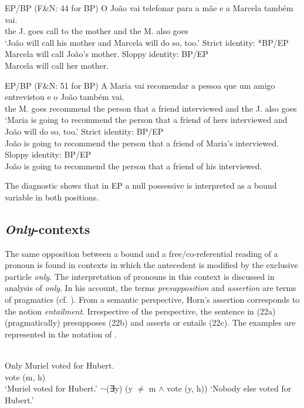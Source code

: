 \documentclass[output=paper]{langsci/langscibook}
\begin{document}
\ea%
         EP\slash BP (F\&N: 44 for BP)\label{ex:wein:20}
    \ea
    \gll O João vai telefonar para a mãe e a Marcela também vai.\\
         the J. goes call to the mother and the M. also goes  \\
    \glt ‘João will call his mother and Marcela will do so, too.’
    \ex Strict identity: *BP\slash *EP\\Marcela will call João’s mother.
    \ex Sloppy identity: BP\slash EP\\Marcela will call her mother.
    \z
\z

\ea%
         EP\slash BP (F\&N: 51 for BP)\label{ex:wein:21}
    \ea
    \gll A Maria vai recomendar a pessoa que um amigo entrevistou e o João também vai.\\
         the M. goes recommend the person that a friend interviewed and the J. also goes\\
    \glt ‘Maria is going to recommend the person that a friend of hers interviewed and João will do so, too.’
    \ex Strict identity: BP\slash *EP\\João is going to recommend the person that a friend of Maria’s interviewed.\\
    \ex Sloppy identity: BP\slash EP\\João is going to recommend the person that a friend of his interviewed. 
    \z
\z

The diagnostic shows that in EP a null possessive is interpreted as a bound variable in both positions.

\subsection{\textit{Only}-contexts}%

The same opposition between a bound and a free/co-referential reading of a pronoun is found in contexts in which the antecedent is modified by the exclusive particle \textit{only.} The interpretation of pronouns in this context is discussed in  analysis of \textit{only}. In his account, the terms \textit{presupposition} and \textit{assertion} are terms of pragmatics (cf. \citealt{Pagin2016}). From a semantic perspective, Horn’s assertion corresponds to the notion \textit{entailment}. Irrespective of the perspective, the sentence in (22a) (pragmatically) presupposes (22b) and asserts or entails (22c). The examples are represented in the notation of \citet{Horn1969}. 

\ea%
    \citet[98–99]{Horn1969}\label{ex:wein:22}\\
    \ea 
    Only Muriel voted for Hubert.\\
    vote (m, h)\\   
    \glt ‘Muriel voted for Hubert.’
    \ex  ¬(∃y) (y ${\neq}$ m ${\wedge}$ vote (y, h))
    \glt ‘Nobody else voted for Hubert.’
    \z
\z
\end{document}

